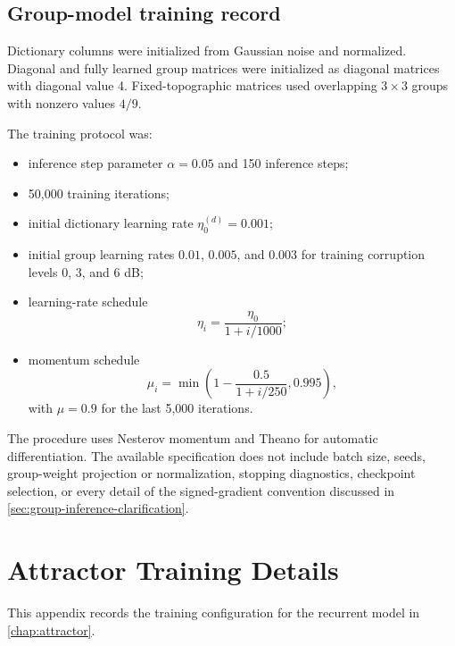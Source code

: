 \section{Group-model training record}
\label{app:group-training}

Dictionary columns were initialized from Gaussian noise and normalized. Diagonal and fully learned group matrices were initialized as diagonal matrices with diagonal value 4. Fixed-topographic matrices used overlapping $3\times3$ groups with nonzero values $4/9$.

The training protocol was:
\begin{itemize}
  \item inference step parameter $\alpha=0.05$ and 150 inference steps;
  \item 50,000 training iterations;
  \item initial dictionary learning rate $\eta_0^{(d)}=0.001$;
  \item initial group learning rates $0.01$, $0.005$, and $0.003$ for training corruption levels 0, 3, and 6 dB;
  \item learning-rate schedule
  \begin{equation}
  \eta_i=\frac{\eta_0}{1+i/1000};
  \end{equation}
  \item momentum schedule
  \begin{equation}
  \mu_i=\min\left(1-\frac{0.5}{1+i/250},0.995\right),
  \end{equation}
  with $\mu=0.9$ for the last 5,000 iterations.
\end{itemize}
The procedure uses Nesterov momentum and Theano for automatic differentiation. The available specification does not include batch size, seeds, group-weight projection or normalization, stopping diagnostics, checkpoint selection, or every detail of the signed-gradient convention discussed in \cref{sec:group-inference-clarification}.

\chapter{Attractor Training Details}
\label{app:attractor-training}

This appendix records the training configuration for the recurrent model in \cref{chap:attractor}.

